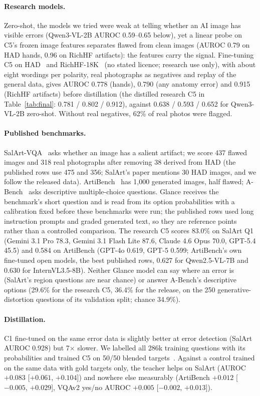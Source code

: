 \documentclass[10pt]{article}
\begin{document}
\paragraph{Research models.} Zero-shot, the models we tried were weak at telling whether an AI image has visible errors (Qwen3-VL-2B AUROC 0.59--0.65 below), yet a linear probe on C5's frozen image features separates flawed from clean images (AUROC 0.79 on HAD hands, 0.96 on RichHF artifacts): the features carry the signal. Fine-tuning C5 on HAD~\cite{hadm2024} and RichHF-18K~\cite{richhf2024} (no stated licence; research use only), with about eight wordings per polarity, real photographs as negatives and replay of the general data, gives AUROC 0.778 (hands), 0.790 (any anatomy error) and 0.915 (RichHF artifacts) before distillation (the distilled research C5 in Table~\ref{tab:final}: 0.781 / 0.802 / 0.912), against 0.638 / 0.593 / 0.652 for Qwen3-VL-2B zero-shot. Without real negatives, 62\% of real photos were flagged.

\paragraph{Published benchmarks.} SalArt-VQA~\cite{salart2026} asks whether an image has a salient artifact; we score 437 flawed images and 318 real photographs after removing 38 derived from HAD (the published rows use 475 and 356; SalArt's paper mentions 30 HAD images, and we follow the released data). ArtiBench~\cite{artibench2026} has 1{,}000 generated images, half flawed; A-Bench~\cite{abench2024} asks descriptive multiple-choice questions. Glance receives the benchmark's short question and is read from its option probabilities with a calibration fixed before these benchmarks were run; the published rows used long instruction prompts and graded generated text, so they are reference points rather than a controlled comparison. The research C5 scores 83.0\% on SalArt Q1 (Gemini 3.1 Pro 78.3, Gemini 3.1 Flash Lite 87.6, Claude 4.6 Opus 70.0, GPT-5.4 45.5) and 0.584 on ArtiBench (GPT-4o 0.619, GPT-5 0.599; ArtiBench's own fine-tuned open models, the best published rows, 0.627 for Qwen2.5-VL-7B and 0.630 for InternVL3.5-8B). Neither Glance model can say where an error is (SalArt's region questions are near chance) or answer A-Bench's descriptive options (29.6\% for the research C5, 36.4\% for the release, on the 250 generative-distortion questions of its validation split; chance 34.9\%).

\paragraph{Distillation.} C1 fine-tuned on the same error data is slightly better at error detection (SalArt AUROC 0.928) but 7$\times$ slower. We labelled all 286k training questions with its probabilities and trained C5 on 50/50 blended targets~\cite{hinton2015}. Against a control trained on the same data with gold targets only, the teacher helps on SalArt (AUROC $+0.083$ [$+0.061$, $+0.104$]) and nowhere else measurably (ArtiBench $+0.012$ [$-0.005$, $+0.029$], VQAv2 yes/no AUROC $+0.005$ [$-0.002$, $+0.013$]).
\end{document}
